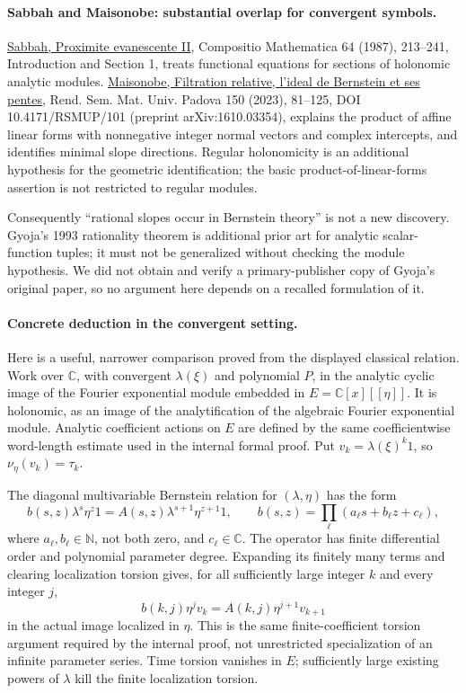 \documentclass[11pt]{article}
\begin{document}
\paragraph{Sabbah and Maisonobe: substantial overlap for convergent symbols.}
\href{https://www.numdam.org/item/CM_1987__64_2_213_0/}{Sabbah, Proximite evanescente II}, Compositio Mathematica 64 (1987), 213--241, Introduction and Section 1, treats functional equations for sections of holonomic analytic modules. \href{https://ems.press/journals/rsmup/articles/10116774}{Maisonobe, Filtration relative, l'ideal de Bernstein et ses pentes}, Rend. Sem. Mat. Univ. Padova 150 (2023), 81--125, DOI 10.4171/RSMUP/101 (preprint arXiv:1610.03354), explains the product of affine linear forms with nonnegative integer normal vectors and complex intercepts, and identifies minimal slope directions. Regular holonomicity is an additional hypothesis for the geometric identification; the basic product-of-linear-forms assertion is not restricted to regular modules.

Consequently ``rational slopes occur in Bernstein theory'' is not a new discovery. Gyoja's 1993 rationality theorem is additional prior art for analytic scalar-function tuples; it must not be generalized without checking the module hypothesis. We did not obtain and verify a primary-publisher copy of Gyoja's original paper, so no argument here depends on a recalled formulation of it.

\paragraph{Concrete deduction in the convergent setting.}
Here is a useful, narrower comparison proved from the displayed classical relation. Work over $\mathbb C$, with convergent $\lambda(\xi)$ and polynomial $P$, in the analytic cyclic image of the Fourier exponential module embedded in $E=\mathbb C[x][[\eta]]$. It is holonomic, as an image of the analytification of the algebraic Fourier exponential module. Analytic coefficient actions on $E$ are defined by the same coefficientwise word-length estimate used in the internal formal proof. Put $v_k=\lambda(\xi)^k1$, so $\nu_\eta(v_k)=\tau_k$.

The diagonal multivariable Bernstein relation for $(\lambda,\eta)$ has the form
\[
 b(s,z)\lambda^s\eta^z1
       =A(s,z)\lambda^{s+1}\eta^{z+1}1,
 \qquad b(s,z)=\prod_\ell(a_\ell s+b_\ell z+c_\ell),
\]
where $a_\ell,b_\ell\in\mathbb N$, not both zero, and $c_\ell\in\mathbb C$. The operator has finite differential order and polynomial parameter degree. Expanding its finitely many terms and clearing localization torsion gives, for all sufficiently large integer $k$ and every integer $j$,
\[
 b(k,j)\eta^jv_k=A(k,j)\eta^{j+1}v_{k+1}
\]
in the actual image localized in $\eta$. This is the same finite-coefficient torsion argument required by the internal proof, not unrestricted specialization of an infinite parameter series. Time torsion vanishes in $E$; sufficiently large existing powers of $\lambda$ kill the finite localization torsion.
\end{document}
